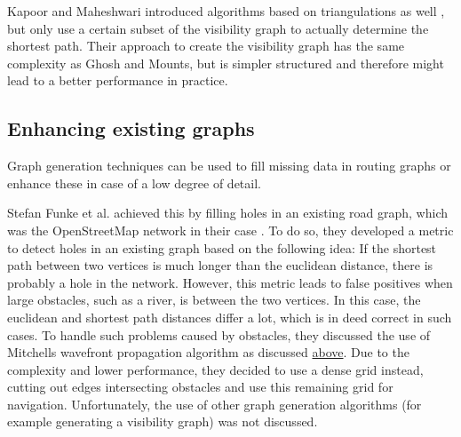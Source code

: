 		Kapoor and Maheshwari introduced algorithms based on triangulations as well \cite{kapoor-shortest-path-vgraph}, but only use a certain subset of the visibility graph to actually determine the shortest path.
		Their approach to create the visibility graph has the same complexity as Ghosh and Mounts, but is simpler structured and therefore might lead to a better performance in practice.
		
		
	
	\subsection{Enhancing existing graphs}
	
		Graph generation techniques can be used to fill missing data in routing graphs or enhance these in case of a low degree of detail.
		
		Stefan Funke et al. achieved this by filling holes in an existing road graph, which was the OpenStreetMap network in their case \cite{funke-osm-extrapolation}.
		To do so, they developed a metric to detect holes in an existing graph based on the following idea:
		If the shortest path between two vertices is much longer than the euclidean distance, there is probably a hole in the network.
		However, this metric leads to false positives when large obstacles, such as a river, is between the two vertices.
		In this case, the euclidean and shortest path distances differ a lot, which is in deed correct in such cases.
		To handle such problems caused by obstacles, they discussed the use of Mitchells wavefront propagation algorithm as discussed \hyperref[related-work:mitchell]{above}.
		Due to the complexity and lower performance, they decided to use a dense grid instead, cutting out edges intersecting obstacles and use this remaining grid for navigation.
		Unfortunately, the use of other graph generation algorithms (for example generating a visibility graph) was not discussed.
		
